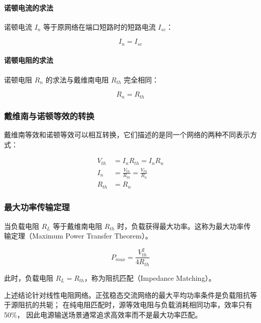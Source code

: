 \paragraph{诺顿电流的求法}

诺顿电流 $I_{n}$ 等于原网络在端口短路时的短路电流 $I_{sc}$：

\begin{equation}
I_{n} = I_{sc} \label{eq:norton-current}
\end{equation}

\paragraph{诺顿电阻的求法}

诺顿电阻 $R_{n}$ 的求法与戴维南电阻 $R_{th}$ 完全相同：

\begin{equation}
R_{n} = R_{th} \label{eq:norton-resistance}
\end{equation}

\subsubsection{戴维南与诺顿等效的转换}

戴维南等效和诺顿等效可以相互转换，它们描述的是同一个网络的两种不同表示方式：

\begin{align}
V_{th} &= I_{n} R_{th} = I_{n} R_{n} \label{eq:thevenin-norton-v} \\
I_{n} &= \frac{V_{th}}{R_{th}} = \frac{V_{th}}{R_{n}} \label{eq:thevenin-norton-i} \\
R_{th} &= R_{n} \label{eq:thevenin-norton-r}
\end{align}

\subsubsection{最大功率传输定理}

当负载电阻 $R_L$ 等于戴维南电阻 $R_{th}$ 时，负载获得最大功率。这称为最大功率传输定理（Maximum Power Transfer Theorem）。

\begin{equation}
P_{max} = \frac{V_{th}^2}{4R_{th}} \label{eq:max-power}
\end{equation}

此时，负载电阻 $R_L = R_{th}$，称为阻抗匹配（Impedance Matching）。

上述结论针对线性电阻网络。正弦稳态交流网络的最大平均功率条件是负载阻抗等于源阻抗的共轭；
在纯电阻匹配时，源等效电阻与负载消耗相同功率，效率只有 50\%，
因此电源输送场景通常追求高效率而不是最大功率匹配。

